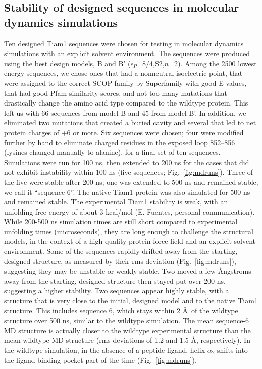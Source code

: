 \documentclass[12pt]{article}
\begin{document}
\subsection{Stability of designed sequences in molecular dynamics simulations}
Ten designed Tiam1 sequences were chosen for testing in molecular dynamics simulations with an explicit solvent environment. The
sequences were produced using the best design models, B and B' ($\epsilon_P$=8/4,S2,$n$=2). Among the 2500 lowest energy sequences,
we chose ones that had a nonneutral isoelectric point, that were assigned to the correct SCOP family by Superfamily with good
E-values, that had good Pfam similarity scores, and not too many mutations that drastically change the amino acid type compared
to the wildtype protein. This left us with 66 sequences from model B and 45 from model B'. In addition, we eliminated two
mutations that created a buried cavity and several that led to net protein charges of +6 or more. Six sequences were chosen;
four were modified further by hand to eliminate charged residues in the exposed loop 852--856 (lysines changed manually to alanine),
for a final set of ten sequences. Simulations were run for 100 ns, then extended to 200 ns for the cases that did not exhibit
instability within 100 ns (five sequences; Fig.\ \ref{fig:mdruns}). Three of the five were stable after 200 ns; one was extended
to 500 ns and remained stable; we call it ``sequence 6''. The native Tiam1 protein was also simulated for 500 ns and remained
stable. The experimental Tiam1 stability is weak, with an unfolding free energy of about 3 kcal/mol (E. Fuentes, personal
communication). While 200-500 ns simulation times are still short compared to experimental unfolding times (microseconds), they
are long enough to challenge the structural models, in the context of a high quality protein force field and an explicit solvent
environment. Some of the sequences rapidly drifted away from the starting, designed structure, as measured by their rms deviation
(Fig.\ \ref{fig:mdruns}), suggesting they may be unstable or weakly stable. Two moved a few {\AA}ngstroms away from the starting,
designed structure then stayed put over 200 ns, suggesting a higher stability. Two sequences appear highly stable, with a structure
that is very close to the initial, designed model and to the native Tiam1 structure. This includes sequence 6, which stays within
2 \AA\ of the wildtype structure over 500 ns, similar to the wildtype simulation. The mean sequence-6 MD structure is actually
closer to the wildtype experimental structure than the mean wildtype MD structure (rms deviations of 1.2 and 1.5 \AA, respectively).
In the wildtype simulation, in the absence of a peptide ligand, helix $\alpha_2$ shifts into the ligand binding pocket part of
the time (Fig.\ \ref{fig:mdruns}).
\end{document}
